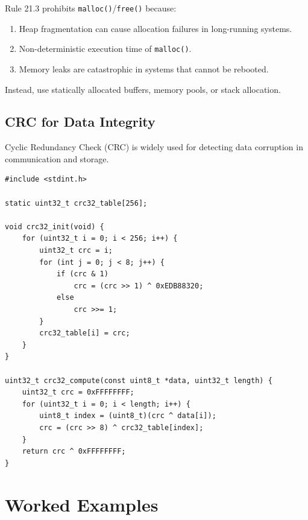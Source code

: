 \begin{important}
Rule 21.3 prohibits \texttt{malloc()}/\texttt{free()} because:
\begin{enumerate}[nosep]
  \item Heap fragmentation can cause allocation failures in long-running systems.
  \item Non-deterministic execution time of \texttt{malloc()}.
  \item Memory leaks are catastrophic in systems that cannot be rebooted.
\end{enumerate}
Instead, use statically allocated buffers, memory pools, or stack allocation.
\end{important}

\subsection{CRC for Data Integrity}

Cyclic Redundancy Check (CRC) is widely used for detecting data corruption in communication and storage.

\begin{lstlisting}[style=C, caption={CRC-32 implementation (IEEE 802.3 polynomial).}]
#include <stdint.h>

static uint32_t crc32_table[256];

void crc32_init(void) {
    for (uint32_t i = 0; i < 256; i++) {
        uint32_t crc = i;
        for (int j = 0; j < 8; j++) {
            if (crc & 1)
                crc = (crc >> 1) ^ 0xEDB88320;
            else
                crc >>= 1;
        }
        crc32_table[i] = crc;
    }
}

uint32_t crc32_compute(const uint8_t *data, uint32_t length) {
    uint32_t crc = 0xFFFFFFFF;
    for (uint32_t i = 0; i < length; i++) {
        uint8_t index = (uint8_t)(crc ^ data[i]);
        crc = (crc >> 8) ^ crc32_table[index];
    }
    return crc ^ 0xFFFFFFFF;
}
\end{lstlisting}

\section{Worked Examples}
\label{sec:ana:examples}


